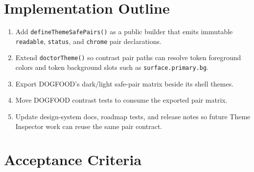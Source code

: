 \section{Implementation Outline}\label{record-180-implementation-outline}

\begin{enumerate}
\def\labelenumi{\arabic{enumi}.}
\tightlist
\item
  Add \texttt{d\allowbreak{}e\allowbreak{}f\allowbreak{}i\allowbreak{}n\allowbreak{}e\allowbreak{}T\allowbreak{}h\allowbreak{}e\allowbreak{}m\allowbreak{}e\allowbreak{}S\allowbreak{}a\allowbreak{}f\allowbreak{}e\allowbreak{}P\allowbreak{}a\allowbreak{}i\allowbreak{}r\allowbreak{}s\allowbreak{}(\allowbreak{})} as a public builder that emits immutable \texttt{r\allowbreak{}e\allowbreak{}a\allowbreak{}d\allowbreak{}a\allowbreak{}b\allowbreak{}l\allowbreak{}e}, \texttt{s\allowbreak{}t\allowbreak{}a\allowbreak{}t\allowbreak{}u\allowbreak{}s}, and \texttt{c\allowbreak{}h\allowbreak{}r\allowbreak{}o\allowbreak{}m\allowbreak{}e} pair declarations.
\item
  Extend \texttt{d\allowbreak{}o\allowbreak{}c\allowbreak{}t\allowbreak{}o\allowbreak{}r\allowbreak{}T\allowbreak{}h\allowbreak{}e\allowbreak{}m\allowbreak{}e\allowbreak{}(\allowbreak{})} so contrast pair paths can resolve token foreground colors and token background slots such as \texttt{s\allowbreak{}u\allowbreak{}r\allowbreak{}f\allowbreak{}a\allowbreak{}c\allowbreak{}e\allowbreak{}.\allowbreak{}p\allowbreak{}r\allowbreak{}i\allowbreak{}m\allowbreak{}a\allowbreak{}r\allowbreak{}y\allowbreak{}.\allowbreak{}b\allowbreak{}g}.
\item
  Export DOGFOOD's dark/light safe-pair matrix beside its shell themes.
\item
  Move DOGFOOD contrast tests to consume the exported pair matrix.
\item
  Update design-system docs, roadmap tests, and release notes so future Theme Inspector work can reuse the same pair contract.
\end{enumerate}

\section{Acceptance Criteria}\label{record-180-acceptance-criteria}

